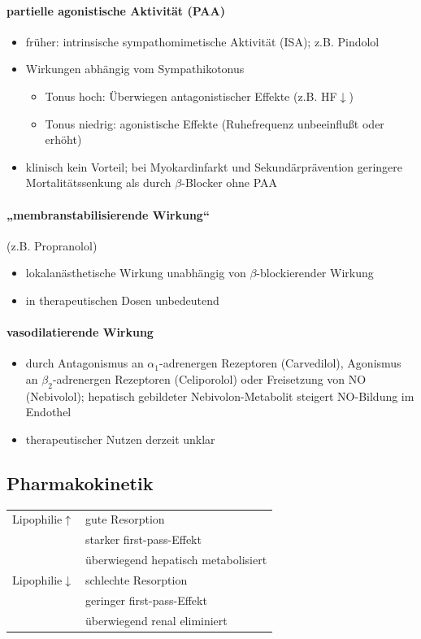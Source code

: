 \documentclass[10pt,a4paper]{report}
\begin{document}
\paragraph{partielle agonistische Aktivität (PAA)}
\begin{itemize}
	\item früher: intrinsische sympathomimetische Aktivität (ISA); z.B. Pindolol
	\item Wirkungen abhängig vom Sympathikotonus
	\begin{itemize}
		\item Tonus hoch: Überwiegen antagonistischer Effekte (z.B. HF$\downarrow$) 
	  	\item Tonus niedrig: agonistische Effekte (Ruhefrequenz unbeeinflußt oder erhöht)
	\end{itemize}		  
	\item klinisch kein Vorteil; bei Myokardinfarkt und Sekundärprävention geringere Mortalitätssenkung als durch $\beta$-Blocker ohne PAA
\end{itemize}
\paragraph{„membranstabilisierende Wirkung“} (z.B. Propranolol)
\begin{itemize}
	\item lokalanästhetische Wirkung unabhängig von $\beta$-blockierender Wirkung
	\item in therapeutischen Dosen unbedeutend
\end{itemize}
\paragraph{vasodilatierende Wirkung}
\begin{itemize}
	\item durch Antagonismus an $\alpha_1$-adrenergen Rezeptoren (Carvedilol), Agonismus an $\beta_2$-adrenergen Rezeptoren (Celiporolol) oder Freisetzung von NO (Nebivolol); hepatisch gebildeter Nebivolon-Metabolit steigert NO-Bildung im Endothel
	\item therapeutischer Nutzen derzeit unklar
\end{itemize}
\subsection{Pharmakokinetik}
\begin{tabularx}{\textwidth}{XX}
Lipophilie$\uparrow$&gute Resorption\\
&starker first-pass-Effekt\\
&überwiegend hepatisch metabolisiert\\
Lipophilie$\downarrow$&schlechte Resorption\\
&geringer first-pass-Effekt\\
&überwiegend renal eliminiert\\
\end{tabularx}
\end{document}
